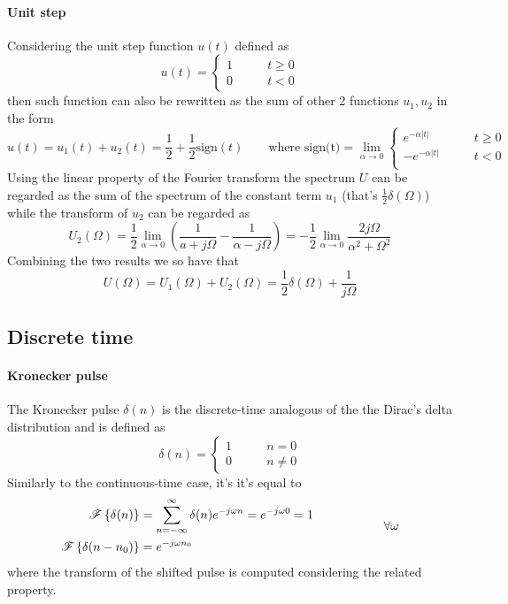 	\paragraph{Unit step} Considering the unit step function $u(t)$ defined as
	\begin{equation}
		u(t) = \begin{cases}
			1 \qquad & t\geq0 \\ 0 & t < 0
		\end{cases}
	\end{equation}
	then such function can also be rewritten as the sum of other 2 functions $u_1,u_2$ in the form
	\[ u(t) = u_1(t) + u_2(t) = \frac 1 2 +\frac 1 2 \textrm{sign} (t) \qquad \textrm{where } \textrm{sign(t)} = \lim_{\alpha\rightarrow 0} \begin{cases}
		e^{-\alpha|t|} \qquad &t\geq 0\\
		-e^{-\alpha|t|} \qquad &t< 0\\
	\end{cases} \]
	Using the linear property of the Fourier transform the spectrum $U$ can be regarded as the sum of the spectrum of the constant term $u_1$ (that's $\frac 1 2 \delta(\Omega)$) while the transform of $u_2$ can be regarded as
	\[ U_2(\Omega) = \frac 1 2 \lim_{\alpha\rightarrow0} \left( \frac{1}{a+j\Omega} - \frac{1}{\alpha - j \Omega} \right) = -\frac 1 2 \lim_{\alpha\rightarrow0} \frac{2j\Omega}{\alpha^2+\Omega^2} \]
	Combining the two results we so have that
	\begin{equation}
		U(\Omega) = U_1(\Omega) + U_2(\Omega) = \frac 1 2\delta(\Omega) + \frac{1}{j\Omega}
	\end{equation}
	
	
\subsection{Discrete time}		
	\paragraph{Kronecker pulse} The Kronecker pulse $\delta(n)$ is the discrete-time analogous of the the Dirac's delta distribution and is defined as
	\begin{equation}
		\delta (n) = \begin{cases}
			1 \qquad & n = 0 \\ 0 & n\neq0
		\end{cases}
	\end{equation}
	Similarly to the continuous-time case, it's \dtft it's equal to
	\begin{equation}
	\begin{aligned}
		\mathscr{F}\left\{ \delta(n) \right\} & = \sum_{n=-\infty}^\infty \delta(n) e^{-j\omega n} = e^{-j\omega 0} = 1 \\
		\mathscr{F}\left\{ \delta(n-n_0) \right\} & = e^{-j\omega n_0}
	\end{aligned} \hspace{2cm} \forall \omega
	\end{equation}
	where the transform of the shifted pulse is computed considering the related property.
	
